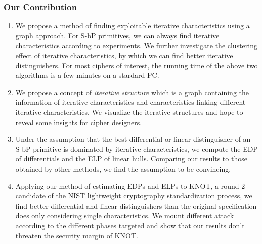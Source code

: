 \subsubsection{Our Contribution}
\begin{enumerate}
    \item We propose a method of finding exploitable iterative characteristics using a graph approach. For S-bP primitives, we can always find iterative characteristics according to experiments. We further investigate the clustering effect of iterative characteristics, by which we can find better iterative distinguishers. For most ciphers of interest, the running time of the above two algorithms is a few minutes on a stardard PC. 
    \item We propose a concept of \textit{iterative structure} which is a graph containing the information of iterative characteristics and characteristics linking different iterative characteristics. We visualize the iterative structures and hope to reveal some insights for cipher designers. 
    \item Under the assumption that the best differential or linear distinguisher of an S-bP primitive is dominated by iterative characteristics, we compute the EDP of differentials and the ELP of linear hulls. Comparing our results to those obtained by other methods, we find the assumption to be convincing. 
    \item Applying our method of estimating EDPs and ELPs to KNOT, a round 2 candidate of the NIST lightweight cryptography standardization process, we find better differential and linear distinguishers than the original specification does only considering single characteristics. We mount different attack according to the different phases targeted and show that our results don't threaten the security margin of KNOT. 
\end{enumerate}


